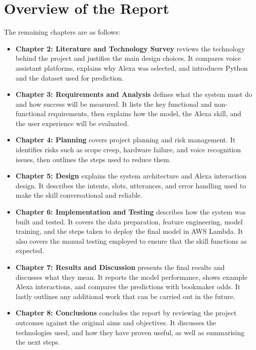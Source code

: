 \section{Overview of the Report}
The remaining chapters are as follows:

\begin{itemize}
    \item \textbf{Chapter 2: Literature and Technology Survey} reviews the technology behind the project and justifies the main design choices. It compares voice assistant platforms, explains why Alexa was selected, and introduces Python and the dataset used for prediction.

    \item \textbf{Chapter 3: Requirements and Analysis} defines what the system must do and how success will be measured. It lists the key functional and non-functional requirements, then explains how the model, the Alexa skill, and the user experience will be evaluated.

    \item \textbf{Chapter 4: Planning} covers project planning and risk management. It identifies risks such as scope creep, hardware failure, and voice recognition issues, then outlines the steps used to reduce them.

    \item \textbf{Chapter 5: Design} explains the system architecture and Alexa interaction design. It describes the intents, slots, utterances, and error handling used to make the skill conversational and reliable.

    \item \textbf{Chapter 6: Implementation and Testing} describes how the system was built and tested. It covers the data preparation, feature engineering, model training, and the steps taken to deploy the final model in AWS Lambda. It also covers the manual testing employed to ensure that the skill functions as expected.

    \item \textbf{Chapter 7: Results and Discussion} presents the final results and discusses what they mean. It reports the model performance, shows example Alexa interactions, and compares the predictions with bookmaker odds. It lastly outlines any additional work that can be carried out in the future.

    \item \textbf{Chapter 8: Conclusions} concludes the report by reviewing the project outcomes against the original aims and objectives. It discusses the technologies used, and how they have proven useful, as well as summarising the next steps.
\end{itemize}